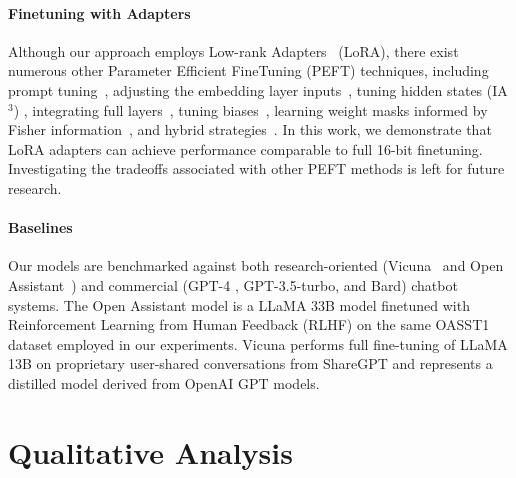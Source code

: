 \paragraph{Finetuning with Adapters} Although our approach employs Low-rank Adapters~\citep{hu2021lora} (LoRA), there exist numerous other Parameter Efficient FineTuning (PEFT) techniques, including prompt tuning~\citep{qin2021learning,lester2021power,li2021prefix}, adjusting the embedding layer inputs~\citep{an2022input}, tuning hidden states (IA$^3$) \citep{liu2022few}, integrating full layers~\citep{houlsby2019parameter}, tuning biases~\citep{zaken2021bitfit}, learning weight masks informed by Fisher information~\citep{sung2021training}, and hybrid strategies~\citep{henderson2021compacter}. In this work, we demonstrate that LoRA adapters can achieve performance comparable to full 16-bit finetuning. Investigating the tradeoffs associated with other PEFT methods is left for future research.

\paragraph{Baselines} Our models are benchmarked against both research-oriented (Vicuna~\citep{vicuna2023} and Open Assistant~\citep{kopf2023openassistant}) and commercial (GPT-4 \citep{openai2023gpt}, GPT-3.5-turbo, and Bard) chatbot systems. The Open Assistant model is a LLaMA 33B model finetuned with Reinforcement Learning from Human Feedback (RLHF) on the same OASST1 dataset employed in our experiments. Vicuna performs full fine-tuning of LLaMA 13B on proprietary user-shared conversations from ShareGPT and represents a distilled model derived from OpenAI GPT models.

\section{Qualitative Analysis}

